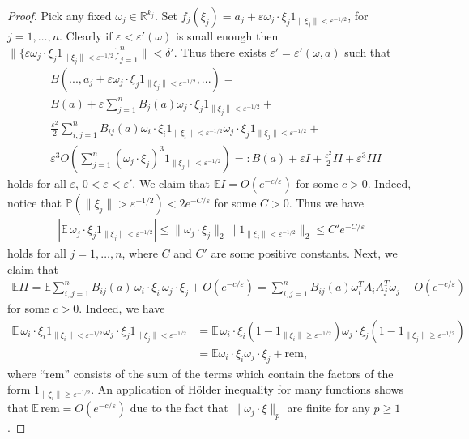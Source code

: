 \documentclass[9pt, a4paper]{amsart}
\newcommand{\1}{{\chi_{}}}%
\numberwithin{equation}{section}
\begin{document}
\begin{proof}
Pick any fixed $\omega_{j} \in \mathbb{R}^{k_{j}}$. Set $f_{j}(\xi_{j}) = a_{j} + \varepsilon \omega_{j} \cdot \xi_{j} 1_{\|\xi_{j}\|<\varepsilon^{-1/2}}$, for $j=1, \ldots, n$. Clearly if $\varepsilon<\varepsilon'(\omega)$ is small enough then $\|\{\varepsilon \omega_{j} \cdot \xi_{j} 1_{\|\xi_{j}\|<\varepsilon^{-1/2}}\}_{j=1}^{n}\|<\delta'$. Thus there exists $\varepsilon'=\varepsilon'(\omega, a)$ such that  
\begin{align*}
    &B(...,a_{j} + \varepsilon \omega_{j} \cdot \xi_{j} 1_{\|\xi_{j}\|<\varepsilon^{-1/2}},...) = \\
    &B(a)+\varepsilon \sum_{j=1}^{n}B_{j}(a)\omega_{j} \cdot \xi_{j} 1_{\|\xi_{j}\|<\varepsilon^{-1/2}}+\\
    &\frac{\varepsilon^{2}}{2}\sum_{i,j=1}^{n} B_{ij}(a) \omega_{i} \cdot \xi_{i} 1_{\|\xi_{i}\|<\varepsilon^{-1/2}} \omega_{j} \cdot \xi_{j} 1_{\|\xi_{j}\|<\varepsilon^{-1/2}}+\\
    &\varepsilon^{3} O\left(\sum_{j=1}^{n} (\omega_{j} \cdot \xi_{j})^{3} 1_{\|\xi_{j}\|<\varepsilon^{-1/2}} \right)=: B(a)+\varepsilon I+\frac{\varepsilon^{2}}{2}II+\varepsilon^{3}III
\end{align*}
holds for all $\varepsilon$, $0<\varepsilon<\varepsilon'$.
We claim that $\mathbb{E} I = O(e^{-c/\varepsilon})$ for some $c>0$. Indeed, notice that $\mathbb{P}(\|\xi_{j}\|>\varepsilon^{-1/2}) < 2e^{-C/\varepsilon}$ for some $C>0$. Thus we have 
\begin{align*}
    |\mathbb{E}\,  \omega_{j} \cdot \xi_{j} 1_{\|\xi_{j}\|<\varepsilon^{-1/2}}|  \leq \| \omega_{j} \cdot \xi_{j}\|_{2} \| 1_{\|\xi_{j}\|<\varepsilon^{-1/2}}\|_{2} \leq C' e^{-C/\varepsilon}
\end{align*}
holds for all $j=1, \ldots, n$, where $C$ and  $C'$ are some positive constants. Next, we claim that 
\begin{align*}
\mathbb{E} II = \mathbb{E} \sum_{i,j=1}^{n}B_{ij}(a)\, \omega_{i} \cdot \xi_{i}\,   \omega_{j} \cdot \xi_{j}  + O(e^{-c/\varepsilon}) = \sum_{i,j=1}^{n}B_{ij}(a)\omega_{i}^{T}A_{i}A_{j}^{T}\omega_{j}+ O(e^{-c/\varepsilon})
\end{align*}
for some $c>0$. Indeed, we have
\begin{align*}
   \mathbb{E}\,   \omega_{i} \cdot \xi_{i} 1_{\|\xi_{i}\|<\varepsilon^{-1/2}} \omega_{j} \cdot \xi_{j} 1_{\|\xi_{j}\|<\varepsilon^{-1/2}} &= \mathbb{E}\,   \omega_{i} \cdot \xi_{i} (1-1_{\|\xi_{i}\|\geq \varepsilon^{-1/2}}) \omega_{j} \cdot \xi_{j} (1-1_{\|\xi_{j}\|\geq \varepsilon^{-1/2}})\\&=
   \mathbb{E} \omega_{i}\cdot \xi_{i} \omega_{j} \cdot \xi_{j}+\mathrm{rem},
\end{align*}
where  ``rem'' consists of the sum of the terms which contain the factors of the form $1_{\|\xi_{i}\|\geq \varepsilon^{-1/2}}$. An application of H\"older inequality for many functions shows that $\mathbb{E}\, \mathrm{rem} = O(e^{-c/\varepsilon})$ due to the fact that $\| \omega_{j} \cdot \xi\|_{p}$ are finite for any $p\geq 1$. 


\end{proof}
\end{document}
